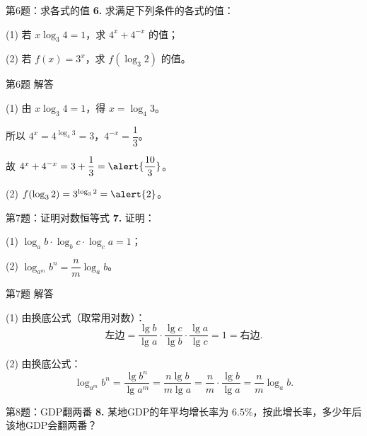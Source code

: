 \documentclass[10pt,aspectratio=169,serif]{beamer}
\begin{document}
\begin{frame}[t]{第6题：求各式的值}
\textbf{6.} 求满足下列条件的各式的值：

\vspace{0.8em}
(1) 若 $x\log_3 4 = 1$，求 $4^x + 4^{-x}$ 的值；

\vspace{0.8em}
(2) 若 $f(x) = 3^x$，求 $f(\log_3 2)$ 的值。
\end{frame}

\begin{frame}[t]{第6题 解答}
\begin{tcolorbox}[colback=orange!10,colframe=orange,title=\textbf{解}]
(1) 由 $x\log_3 4 = 1$，得 $x = \log_4 3$。

\hspace{2em}所以 $4^x = 4^{\log_4 3} = 3$，$4^{-x} = \dfrac{1}{3}$。

\hspace{2em}故 $4^x + 4^{-x} = 3 + \dfrac{1}{3} = \alert{\dfrac{10}{3}}$。

(2) $f(\log_3 2) = 3^{\log_3 2} = \alert{2}$。
\end{tcolorbox}
\end{frame}

\begin{frame}[t]{第7题：证明对数恒等式}
\textbf{7.} 证明：

\vspace{0.8em}
(1) $\log_a b \cdot \log_b c \cdot \log_c a = 1$；

\vspace{0.8em}
(2) $\log_{a^m} b^n = \dfrac{n}{m}\log_a b$。
\end{frame}

\begin{frame}[t]{第7题 解答}
\begin{tcolorbox}[colback=orange!10,colframe=orange,title=\textbf{证明}]
(1) 由换底公式（取常用对数）：
\[
\text{左边} = \frac{\lg b}{\lg a}\cdot\frac{\lg c}{\lg b}\cdot\frac{\lg a}{\lg c} = 1 = \text{右边}.
\]

(2) 由换底公式：
\[
\log_{a^m} b^n = \frac{\lg b^n}{\lg a^m} = \frac{n\lg b}{m\lg a} = \frac{n}{m}\cdot\frac{\lg b}{\lg a} = \frac{n}{m}\log_a b.
\]
\end{tcolorbox}
\end{frame}

\begin{frame}[t]{第8题：GDP翻两番}
\textbf{8.} 某地GDP的年平均增长率为 $6.5\%$，按此增长率，多少年后该地GDP会翻两番？
\end{frame}
\end{document}
